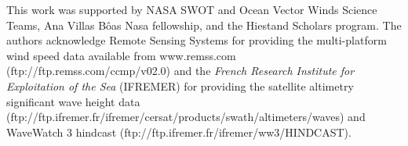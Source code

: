 \documentclass[draft,linenumbers]{agujournal2018}
\begin{document}
\acknowledgments
 This work was supported by NASA SWOT and Ocean Vector Winds Science Teams, Ana Villas B\^oas Nasa fellowship, and the Hiestand Scholars program. The authors acknowledge Remote Sensing Systems for providing the multi-platform wind speed data available from www.remss.com (ftp://ftp.remss.com/ccmp/v02.0) and the \textit{French Research Institute for Exploitation of the Sea} (IFREMER) for providing the satellite altimetry significant wave height data (ftp://ftp.ifremer.fr/ifremer/cersat/products/swath/altimeters/waves) and WaveWatch 3 hindcast (ftp://ftp.ifremer.fr/ifremer/ww3/HINDCAST). 


%


%





\end{document}

